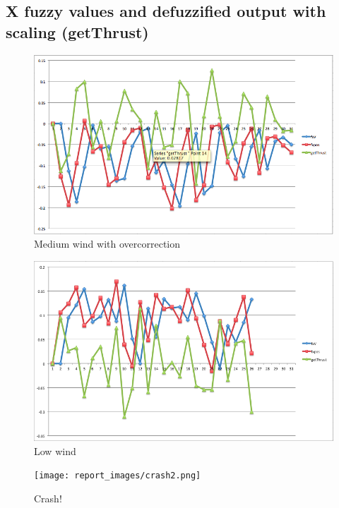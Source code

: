 \documentclass[12pt]{article}
\begin{document}
\pagebreak

\subsection{X fuzzy values and defuzzified output with scaling (getThrust)}

\begin{figure}[h!]
        \begin{center}
                \includegraphics[width=130mm]{report_images/med_wind.png}
                \caption{Medium wind with overcorrection}
                \label{med_wind}
        \end{center}
\end{figure}

\pagebreak

\begin{figure}[h!]
        \begin{center}
                \includegraphics[width=130mm]{report_images/low_wind.png}
                \caption{Low wind}
                \label{low_wind}
        \end{center}
\end{figure}

\begin{figure}[h!]
        \begin{center}
                \texttt{[image: report\_images/crash2.png]}
                \caption{Crash!}
                \label{low_wind}
        \end{center}
\end{figure}
\end{document}
